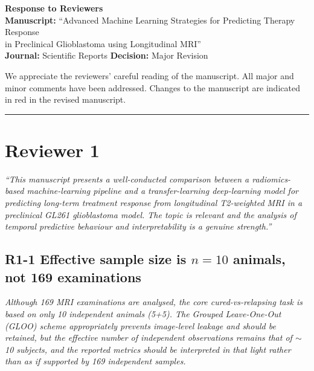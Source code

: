 \documentclass[12pt]{article}
\newcommand{\rc}[1]{\begin{reviewerbox}\itshape #1\end{reviewerbox}}
\begin{document}
\begin{center}
{\large\textbf{Response to Reviewers}}\\[6pt]
\textbf{Manuscript:} ``Advanced Machine Learning Strategies for Predicting Therapy Response\\
in Preclinical Glioblastoma using Longitudinal MRI''\\[4pt]
\textbf{Journal:} Scientific Reports \quad \textbf{Decision:} Major Revision
\end{center}

\bigskip

We appreciate the reviewers' careful reading of the manuscript. All major and minor comments have been addressed. Changes to the manuscript are indicated in red in the revised manuscript.

\vspace{18pt}\hrule\vspace{18pt}

\vspace{6pt}%
\section*{Reviewer 1}

\textit{``This manuscript presents a well-conducted comparison between a radiomics-based machine-learning pipeline and a transfer-learning deep-learning model for predicting long-term treatment response from longitudinal T2-weighted MRI in a preclinical GL261 glioblastoma model. The topic is relevant and the analysis of temporal predictive behaviour and interpretability is a genuine strength.''}

\bigskip

\vspace{6pt}%
\subsection*{R1-1 \quad Effective sample size is $n=10$ animals, not 169 examinations}

\rc{Although 169 MRI examinations are analysed, the core cured-vs-relapsing task is based on only 10 independent animals (5+5). The Grouped Leave-One-Out (GLOO) scheme appropriately prevents image-level leakage and should be retained, but the effective number of independent observations remains that of $\sim$10 subjects, and the reported metrics should be interpreted in that light rather than as if supported by 169 independent samples.}
\end{document}
